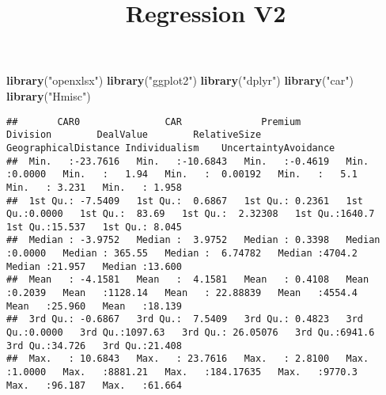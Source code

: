 \documentclass[]{article}
\title{Regression V2}
\author{}
\date{}
\newenvironment{Shaded}{\begin{snugshade}}{\end{snugshade}}
\newcommand{\KeywordTok}[1]{\textcolor[rgb]{0.13,0.29,0.53}{\textbf{#1}}}
\newcommand{\StringTok}[1]{\textcolor[rgb]{0.31,0.60,0.02}{#1}}
\newcommand{\NormalTok}[1]{#1}
\begin{document}
\maketitle

\begin{Shaded}
\begin{Highlighting}[]
\KeywordTok{library}\NormalTok{(}\StringTok{"openxlsx"}\NormalTok{)}
\KeywordTok{library}\NormalTok{(}\StringTok{"ggplot2"}\NormalTok{)}
\KeywordTok{library}\NormalTok{(}\StringTok{"dplyr"}\NormalTok{)}
\KeywordTok{library}\NormalTok{(}\StringTok{"car"}\NormalTok{)}
\KeywordTok{library}\NormalTok{(}\StringTok{"Hmisc"}\NormalTok{)}
\end{Highlighting}
\end{Shaded}

\begin{verbatim}
##       CAR0               CAR              Premium           Division        DealValue        RelativeSize       GeographicalDistance Individualism    UncertaintyAvoidance
##  Min.   :-23.7616   Min.   :-10.6843   Min.   :-0.4619   Min.   :0.0000   Min.   :   1.94   Min.   :  0.00192   Min.   :   5.1       Min.   : 3.231   Min.   : 1.958      
##  1st Qu.: -7.5409   1st Qu.:  0.6867   1st Qu.: 0.2361   1st Qu.:0.0000   1st Qu.:  83.69   1st Qu.:  2.32308   1st Qu.:1640.7       1st Qu.:15.537   1st Qu.: 8.045      
##  Median : -3.9752   Median :  3.9752   Median : 0.3398   Median :0.0000   Median : 365.55   Median :  6.74782   Median :4704.2       Median :21.957   Median :13.600      
##  Mean   : -4.1581   Mean   :  4.1581   Mean   : 0.4108   Mean   :0.2039   Mean   :1128.14   Mean   : 22.88839   Mean   :4554.4       Mean   :25.960   Mean   :18.139      
##  3rd Qu.: -0.6867   3rd Qu.:  7.5409   3rd Qu.: 0.4823   3rd Qu.:0.0000   3rd Qu.:1097.63   3rd Qu.: 26.05076   3rd Qu.:6941.6       3rd Qu.:34.726   3rd Qu.:21.408      
##  Max.   : 10.6843   Max.   : 23.7616   Max.   : 2.8100   Max.   :1.0000   Max.   :8881.21   Max.   :184.17635   Max.   :9770.3       Max.   :96.187   Max.   :61.664
\end{verbatim}
\end{document}
